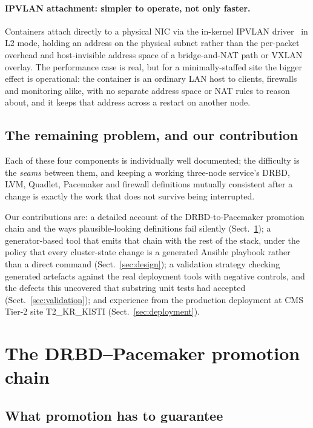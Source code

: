 \documentclass{webofc}
\begin{document}
\paragraph{IPVLAN attachment: simpler to operate, not only faster.}
Containers attach directly to a physical NIC via the in-kernel IPVLAN
driver~\cite{ipvlan} in L2 mode, holding an address on the physical
subnet rather than the per-packet overhead and host-invisible address
space of a bridge-and-NAT path or VXLAN overlay. The performance case is
real, but for a minimally-staffed site the bigger effect is operational:
the container is an ordinary LAN host to clients, firewalls and
monitoring alike, with no separate address space or NAT rules to reason
about, and it keeps that address across a restart on another node.

\subsection{The remaining problem, and our contribution}

Each of these four components is individually well documented; the
difficulty is the \emph{seams} between them, and keeping a working
three-node service's DRBD, LVM, Quadlet, Pacemaker and firewall
definitions mutually consistent after a change is exactly the work that
does not survive being interrupted.

Our contributions are: a detailed account of the DRBD-to-Pacemaker
promotion chain and the ways plausible-looking definitions fail silently
(Sect.~\ref{sec:promote}); a generator-based tool that emits that chain
with the rest of the stack, under the policy that every cluster-state
change is a generated Ansible playbook rather than a direct command
(Sect.~\ref{sec:design}); a validation strategy checking generated
artefacts against the real deployment tools with negative controls, and
the defects this uncovered that substring unit tests had accepted
(Sect.~\ref{sec:validation}); and experience from the production
deployment at CMS Tier-2 site T2\_KR\_KISTI (Sect.~\ref{sec:deployment}).

\section{The DRBD--Pacemaker promotion chain}
\label{sec:promote}

\subsection{What promotion has to guarantee}
\end{document}
